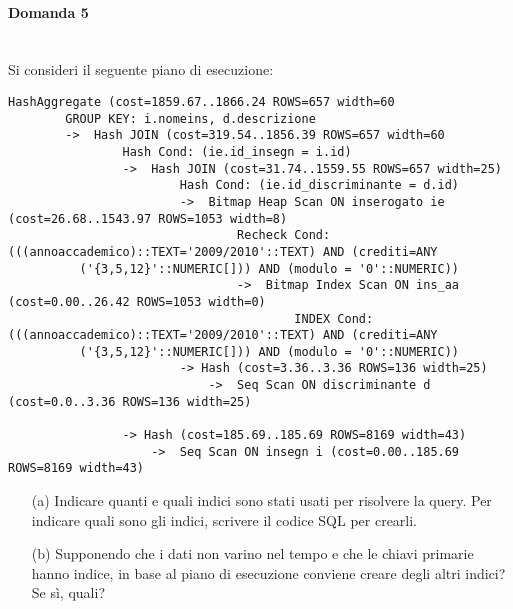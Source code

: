 \documentclass[a4paper, 10pt, titlepage]{article}
\begin{document}
\paragraph{Domanda 5}\dotfill \medskip \\
Si consideri il seguente piano di esecuzione:
\begin{scriptsize}
\begin{lstlisting}[tabsize=2]
	HashAggregate (cost=1859.67..1866.24 ROWS=657 width=60
		GROUP KEY: i.nomeins, d.descrizione
		->	Hash JOIN (cost=319.54..1856.39 ROWS=657 width=60
				Hash Cond: (ie.id_insegn = i.id)
				->	Hash JOIN (cost=31.74..1559.55 ROWS=657 width=25)
						Hash Cond: (ie.id_discriminante = d.id)
						->	Bitmap Heap Scan ON inserogato ie (cost=26.68..1543.97 ROWS=1053 width=8)
								Recheck Cond: (((annoaccademico)::TEXT='2009/2010'::TEXT) AND (crediti=ANY
		  ('{3,5,12}'::NUMERIC[])) AND (modulo = '0'::NUMERIC))
		  						->	Bitmap Index Scan ON ins_aa (cost=0.00..26.42 ROWS=1053 width=0)
		  								INDEX Cond: (((annoaccademico)::TEXT='2009/2010'::TEXT) AND (crediti=ANY
		  ('{3,5,12}'::NUMERIC[])) AND (modulo = '0'::NUMERIC))
		  				-> Hash (cost=3.36..3.36 ROWS=136 width=25)
		  					->	Seq Scan ON discriminante d (cost=0.0..3.36 ROWS=136 width=25)
		  					
		  		-> Hash (cost=185.69..185.69 ROWS=8169 width=43)
		  			->	Seq Scan ON insegn i (cost=0.00..185.69 ROWS=8169 width=43) 
\end{lstlisting}
\end{scriptsize}

\begin{itemize}
\item[(a)] Indicare quanti e quali indici sono stati usati per risolvere la query. Per indicare quali sono gli indici, scrivere il codice SQL per crearli.
\item[(b)] Supponendo che i dati non varino nel tempo e che le chiavi primarie hanno indice, in base al piano di esecuzione conviene creare degli altri indici? Se sì, quali?
\end{itemize}
\end{document}
